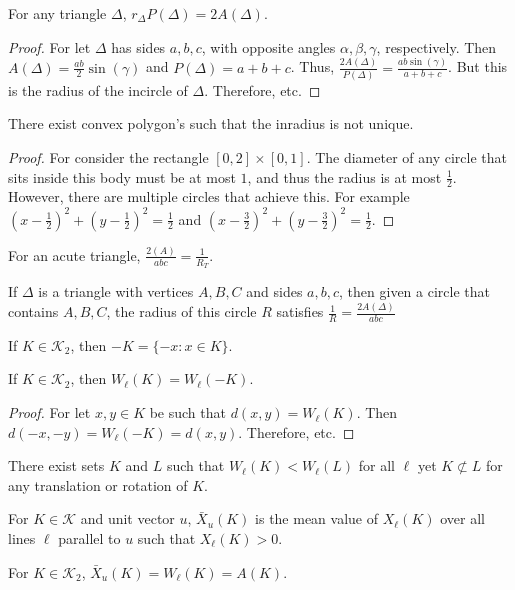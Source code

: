 \documentclass[crop=false,class=article,oneside]{standalone}
\begin{document}
        \begin{theorem}
        For any triangle $\Delta$, $r_{\Delta}P(\Delta) = 2A(\Delta)$.
        \end{theorem}
        \begin{proof}
        For let $\Delta$ has sides $a,b,c$, with opposite angles $\alpha, \beta, \gamma$, respectively. Then $A(\Delta) = \frac{ab}{2}\sin(\gamma)$ and $P(\Delta)=a+b+c$. Thus, $\frac{2A(\Delta)}{P(\Delta)} = \frac{ab\sin(\gamma)}{a+b+c}$. But this is the radius of the incircle of $\Delta$. Therefore, etc.
        \end{proof}
        \begin{theorem}
        \end{theorem}
        \begin{theorem}
        There exist convex polygon's such that the inradius is not unique.
        \end{theorem}
        \begin{proof}
        For consider the rectangle $[0,2]\times [0,1]$. The diameter of any circle that sits inside this body must be at most $1$, and thus the radius is at most $\frac{1}{2}$. However, there are multiple circles that achieve this. For example $(x-\frac{1}{2})^2+(y-\frac{1}{2})^2=\frac{1}{2}$ and $(x-\frac{3}{2})^2+(y-\frac{3}{2})^2=\frac{1}{2}$.
        \end{proof}
        \begin{theorem}
        For an acute triangle, $\frac{2(A)}{abc} = \frac{1}{R_T}$.
        \end{theorem}
        \begin{theorem}
        If $\Delta$ is a triangle with vertices $A,B,C$ and sides $a,b,c$, then given a circle that contains $A,B,C$, the radius of this circle $R$ satisfies $\frac{1}{R} =\frac{2A(\Delta)}{abc}$
        \end{theorem}
        \begin{definition}
        If $K\in \mathscr{K}_2$, then $-K = \{-x:x\in K\}$.
        \end{definition}
        \begin{theorem}
        If $K\in \mathscr{K}_2$, then $W_{\ell}(K) = W_{\ell}(-K)$.
        \end{theorem}
        \begin{proof}
        For let $x,y\in K$ be such that $d(x,y) = W_{\ell}(K)$. Then $d(-x,-y) = W_{\ell}(-K) = d(x,y)$. Therefore, etc.
        \end{proof}
        \begin{theorem}
        There exist sets $K$ and $L$ such that $W_{\ell}(K)<W_{\ell}(L)$ for all $\ell$ yet $K\not\subset L$ for any translation or rotation of $K$.
        \end{theorem}
        \begin{definition}
        For $K\in \mathscr{K}$ and unit vector $u$, $\bar{X}_{u}(K)$ is the mean value of $X_{\ell}(K)$ over all lines $\ell$ parallel to $u$ such that $X_{\ell}(K)>0$.
        \end{definition}
        \begin{theorem}
        For $K\in \mathscr{K}_2$, $\bar{X}_{u}(K) = W_{\ell}(K)=A(K)$.
        \end{theorem}
\end{document}
